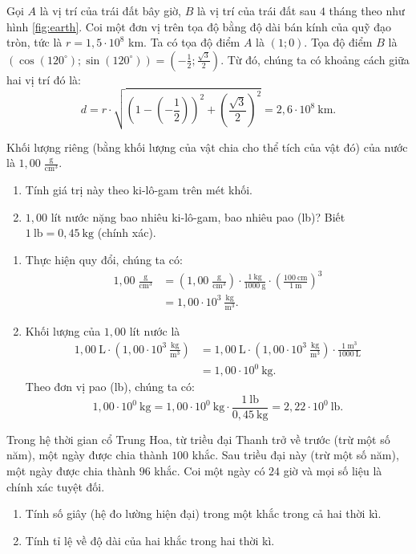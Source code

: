 \documentclass[a4paper, titlepage, openany]{book}
\newcounter{exercise}
\newcounter{solution}
\numberwithin{equation}{chapter}
\begin{document}
Gọi $A$ là vị trí của trái đất bây giờ, $B$ là vị trí của trái đất sau $4$ tháng theo như hình \ref{fig:earth}. Coi một đơn vị trên tọa độ bằng độ dài bán kính của quỹ đạo tròn, tức là $r=1{,}5\cdot10^8$ km. Ta có tọa độ điểm $A$ là $(1;0)$. Tọa độ điểm $B$ là $\left(\cos(120^{\circ}); \sin(120^{\circ})\right)=\left(-\frac{1}{2}; \frac{\sqrt{3}}{2}\right)$. Từ đó, chúng ta có khoảng cách giữa hai vị trí đó là: $$d = r\cdot \sqrt{\left(1-\left(-\frac{1}{2}\right)\right)^2 + \left(\frac{\sqrt{3}}{2}\right)^2}=\boxed{2{,}6\cdot10^8\ \text{km}}.$$

\exercise Khối lượng riêng (bằng khối lượng của vật chia cho thể tích của vật đó) của nước là $1{,}00 \;\frac{\text{g}}{\text{cm}^3}$.
\begin{enumerate}
   \item Tính giá trị này theo ki-lô-gam trên mét khối.
   \item $1{,}00$ lít nước nặng bao nhiêu ki-lô-gam, bao nhiêu pao (lb)? Biết $1\ \text{lb} = 0{,}45\ \text{kg}$ (chính xác).
\end{enumerate}

\solution
\begin{enumerate}
   \item Thực hiện quy đổi, chúng ta có:
   \begin{align*}
      1{,}00\;\frac{\text{g}}{\text{cm}^3} &= \left(1{,}00\;\frac{\text{g}}{\text{cm}^3}\right)\cdot\frac{1\ \text{kg}}{1000\ \text{g}}\cdot\left(\frac{100\ \text{cm}}{1\ \text{m}}\right)^3 \\
      &= \boxed{1{,}00\cdot 10^3\ \frac{\text{kg}}{\text{m}^3}}.
   \end{align*}
   \item Khối lượng của $1{,}00$ lít nước là
   \begin{align*}
      1{,}00\ \text{L} \cdot \left(1{,}00\cdot 10^3\ \frac{\text{kg}}{\text{m}^3}\right)&= 1{,}00\ \text{L} \cdot \left(1{,}00\cdot 10^3\ \frac{\text{kg}}{\text{m}^3}\right) \cdot \frac{1\ \text{m}^3}{1000\ \text{L}} \\
      &= \boxed{1{,}00\cdot 10^0\ \text{kg}}.
   \end{align*}
   Theo đơn vị pao (lb), chúng ta có:
   \[
      1{,}00\cdot 10^0\ \text{kg} = 1{,}00\cdot 10^0\ \text{kg} \cdot \frac{1\ \text{lb}}{0{,}45\ \text{kg}} = \boxed{2{,}22\cdot 10^0\ \text{lb}}.
   \]
\end{enumerate}

\exercise Trong hệ thời gian cổ Trung Hoa, từ triều đại Thanh trở về trước (trừ một số năm), một ngày được chia thành $100$ khắc. Sau triều đại này (trừ một số năm), một ngày được chia thành $96$ khắc. Coi một ngày có $24$ giờ và mọi số liệu là chính xác tuyệt đối.
\begin{enumerate}
   \item Tính số giây (hệ đo lường hiện đại) trong một khắc trong cả hai thời kì.
   \item Tính tỉ lệ về độ dài của hai khắc trong hai thời kì.
\end{enumerate}
\end{document}
